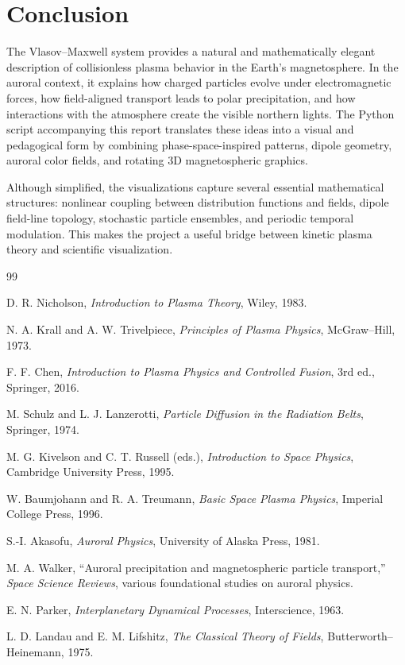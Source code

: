\documentclass[11pt]{article}
\begin{document}
\section{Conclusion}
The Vlasov--Maxwell system provides a natural and mathematically elegant description of collisionless plasma behavior in the Earth's magnetosphere. In the auroral context, it explains how charged particles evolve under electromagnetic forces, how field-aligned transport leads to polar precipitation, and how interactions with the atmosphere create the visible northern lights. The Python script accompanying this report translates these ideas into a visual and pedagogical form by combining phase-space-inspired patterns, dipole geometry, auroral color fields, and rotating 3D magnetospheric graphics.

Although simplified, the visualizations capture several essential mathematical structures: nonlinear coupling between distribution functions and fields, dipole field-line topology, stochastic particle ensembles, and periodic temporal modulation. This makes the project a useful bridge between kinetic plasma theory and scientific visualization.

\begin{thebibliography}{99}

D. R. Nicholson,
\textit{Introduction to Plasma Theory},
Wiley, 1983.

N. A. Krall and A. W. Trivelpiece,
\textit{Principles of Plasma Physics},
McGraw--Hill, 1973.

F. F. Chen,
\textit{Introduction to Plasma Physics and Controlled Fusion},
3rd ed., Springer, 2016.

M. Schulz and L. J. Lanzerotti,
\textit{Particle Diffusion in the Radiation Belts},
Springer, 1974.

M. G. Kivelson and C. T. Russell (eds.),
\textit{Introduction to Space Physics},
Cambridge University Press, 1995.

W. Baumjohann and R. A. Treumann,
\textit{Basic Space Plasma Physics},
Imperial College Press, 1996.

S.-I. Akasofu,
\textit{Auroral Physics},
University of Alaska Press, 1981.

M. A. Walker,
``Auroral precipitation and magnetospheric particle transport,''
\textit{Space Science Reviews}, various foundational studies on auroral physics.

E. N. Parker,
\textit{Interplanetary Dynamical Processes},
Interscience, 1963.

L. D. Landau and E. M. Lifshitz,
\textit{The Classical Theory of Fields},
Butterworth--Heinemann, 1975.

\end{thebibliography}
\end{document}
